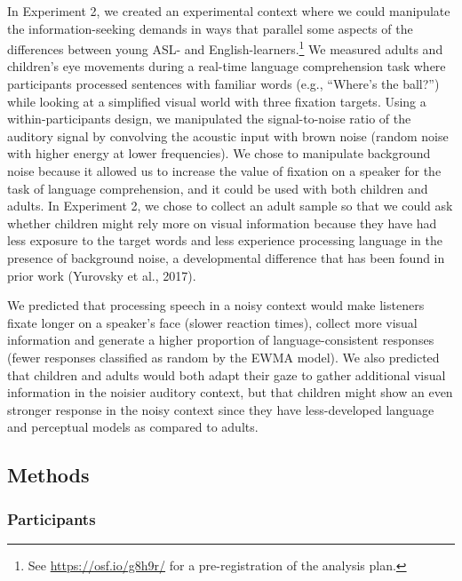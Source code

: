 \documentclass[,man,floatsintext]{apa6}
\let\rmarkdownfootnote\footnote%
\def\footnote{\protect\rmarkdownfootnote}
\begin{document}
In Experiment 2, we created an experimental context where we could manipulate the information-seeking demands in ways that parallel some aspects of the differences between young ASL- and English-learners.\footnote{See \url{https://osf.io/g8h9r/} for a pre-registration of the analysis plan.} We measured adults and children's eye movements during a real-time language comprehension task where participants processed sentences with familiar words (e.g., \enquote{Where's the ball?}) while looking at a simplified visual world with three fixation targets. Using a within-participants design, we manipulated the signal-to-noise ratio of the auditory signal by convolving the acoustic input with brown noise (random noise with higher energy at lower frequencies). We chose to manipulate background noise because it allowed us to increase the value of fixation on a speaker for the task of language comprehension, and it could be used with both children and adults. In Experiment 2, we chose to collect an adult sample so that we could ask whether children might rely more on visual information because they have had less exposure to the target words and less experience processing language in the presence of background noise, a developmental difference that has been found in prior work (Yurovsky et al., 2017).

We predicted that processing speech in a noisy context would make listeners fixate longer on a speaker's face (slower reaction times), collect more visual information and generate a higher proportion of language-consistent responses (fewer responses classified as random by the EWMA model). We also predicted that children and adults would both adapt their gaze to gather additional visual information in the noisier auditory context, but that children might show an even stronger response in the noisy context since they have less-developed language and perceptual models as compared to adults.

\hypertarget{methods-1}{%
\subsection{Methods}\label{methods-1}}

\hypertarget{participants-1}{%
\subsubsection{Participants}\label{participants-1}}
\end{document}
